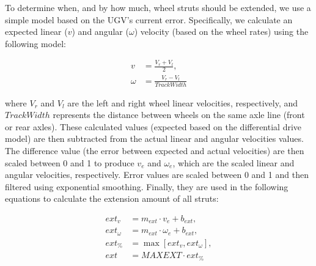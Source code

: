 To determine when, and by how much, wheel struts should be extended, we use a simple model based on the UGV's current error. Specifically, we calculate an expected linear ($v$) and angular ($\omega$) velocity (based on the wheel rates) using the following model:

%


\begin{align}
  v &= \frac{V_r + V_l}{2},\\
  \omega &= \frac{V_r - V_l}{\mathit{TrackWidth}}
\end{align}

\noindent
where $V_r$ and $V_l$ are the left and right wheel linear velocities,
respectively, and $\mathit{TrackWidth}$ represents the distance between wheels on the same axle line (front or rear axles).
%
%
%
These calculated values (expected based on the differential drive model) are then subtracted from the actual linear and angular velocities values.
%
The difference value (the error between expected and actual velocities) are then scaled between 0 and 1 to produce $v_e$ and $\omega_e$, which are the scaled linear and angular velocities, respectively.
%
Error values are scaled between 0 and 1 and then filtered using exponential smoothing. Finally, they are used in the following equations to calculate the extension amount of all struts:


\begin{align}
    \mathit{ext}_v &= m_{\mathit{ext}} \cdot v_e + b_{\mathit{ext}},\\
    \mathit{ext}_\omega &= m_{\mathit{ext}} \cdot \omega_e + b_{\mathit{ext}},\\
    \mathit{ext}_\% &= \max[\mathit{ext}_v, \mathit{ext}_\omega],\\
    \mathit{ext} &= \mathit{MAXEXT} \cdot \mathit{ext}_\%
\end{align}

